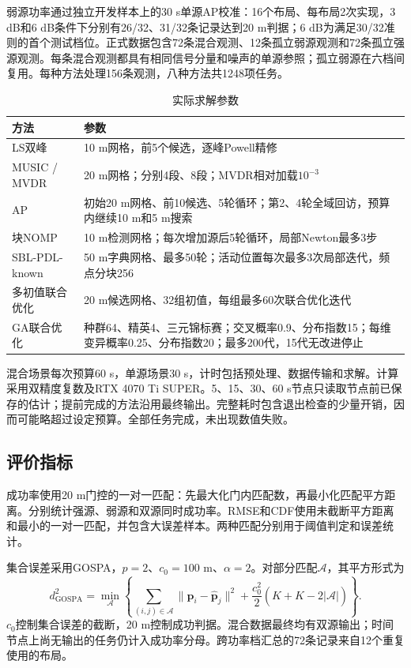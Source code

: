 弱源功率通过独立开发样本上的30 s单源AP校准：16个布局、每布局2次实现，3 dB和6 dB条件下分别有26/32、31/32条记录达到20 m判据；6 dB为满足30/32准则的首个测试档位。正式数据包含72条混合观测、12条孤立弱源观测和72条孤立强源观测。每条混合观测都具有相同信号分量和噪声的单源参照；孤立弱源在六档间复用。每种方法处理156条观测，八种方法共1248项任务。

\begin{table}[htbp]\centering\small
\caption{实际求解参数}\label{tab:new-config}
\begin{tabularx}{\linewidth}{lY{1}}\toprule
方法 & 参数\\\midrule
LS双峰 & 10 m网格，前5个候选，逐峰Powell精修\\
MUSIC / MVDR & 20 m网格；分别4段、8段；MVDR相对加载$10^{-3}$\\
AP & 初始20 m网格、前10候选、5轮循环；第2、4轮全域回访，预算内继续10 m和5 m搜索\\
块NOMP & 10 m检测网格；每次增加源后5轮循环，局部Newton最多3步\\
SBL-PDL-known & 50 m字典网格、最多50轮；活动位置每次最多3次局部迭代，频点分块256\\
多初值联合优化 & 20 m候选网格、32组初值，每组最多60次联合优化迭代\\
GA联合优化 & 种群64、精英4、三元锦标赛；交叉概率0.9、分布指数15；每维变异概率0.25、分布指数20；最多200代，15代无改进停止\\\bottomrule
\end{tabularx}
\end{table}
混合场景每次预算60 s，单源场景30 s，计时包括预处理、数据传输和求解。计算采用双精度复数及RTX 4070 Ti SUPER。5、15、30、60 s节点只读取节点前已保存的估计；提前完成的方法沿用最终输出。完整耗时包含退出检查的少量开销，因而可能略超过设定预算。全部任务完成，未出现数值失败。

\subsection{评价指标}
成功率使用20 m门控的一对一匹配：先最大化门内匹配数，再最小化匹配平方距离。分别统计强源、弱源和双源同时成功率。RMSE和CDF使用未截断平方距离和最小的一对一匹配，并包含大误差样本。两种匹配分别用于阈值判定和误差统计。

集合误差采用GOSPA\cite{ref12}，$p=2$、$c_0=100$ m、$\alpha=2$。对部分匹配$\mathcal A$，其平方形式为
\begin{equation}
d_{\mathrm{GOSPA}}^2=\min_{\mathcal A}\left\{\sum_{(i,j)\in\mathcal A}\|\mathbf p_i-\widehat{\mathbf p}_j\|^2+
\frac{c_0^2}{2}\left(K+\widehat K-2|\mathcal A|\right)\right\}.
\end{equation}
$c_0$控制集合误差的截断，20 m控制成功判据。混合数据最终均有双源输出；时间节点上尚无输出的任务仍计入成功率分母。跨功率档汇总的72条记录来自12个重复使用的布局。

